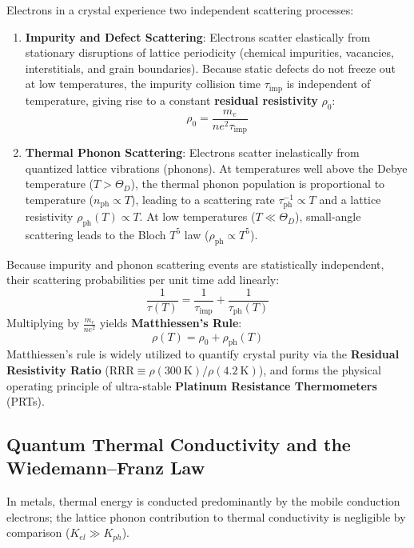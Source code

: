 \documentclass[11pt,a4paper]{article}
\begin{document}
Electrons in a crystal experience two independent scattering processes:
\begin{enumerate}[leftmargin=*]
    \item \textbf{Impurity and Defect Scattering}: Electrons scatter elastically from stationary disruptions of lattice periodicity (chemical impurities, vacancies, interstitials, and grain boundaries). Because static defects do not freeze out at low temperatures, the impurity collision time $\tau_{\mathrm{imp}}$ is independent of temperature, giving rise to a constant \textbf{residual resistivity} $\rho_0$:
    \begin{equation}
    \rho_0 = \frac{m_e}{n e^2 \tau_{\mathrm{imp}}}
    \end{equation}
    \item \textbf{Thermal Phonon Scattering}: Electrons scatter inelastically from quantized lattice vibrations (phonons). At temperatures well above the Debye temperature ($T > \Theta_D$), the thermal phonon population is proportional to temperature ($n_{\mathrm{ph}} \propto T$), leading to a scattering rate $\tau_{\mathrm{ph}}^{-1} \propto T$ and a lattice resistivity $\rho_{\mathrm{ph}}(T) \propto T$. At low temperatures ($T \ll \Theta_D$), small-angle scattering leads to the Bloch $T^5$ law ($\rho_{\mathrm{ph}} \propto T^5$).
\end{enumerate}
Because impurity and phonon scattering events are statistically independent, their scattering probabilities per unit time add linearly:
\begin{equation}
\boxed{\frac{1}{\tau(T)} = \frac{1}{\tau_{\mathrm{imp}}} + \frac{1}{\tau_{\mathrm{ph}}(T)}}
\label{eq:scattering_rates_sum}
\end{equation}
Multiplying by $\frac{m_e}{ne^2}$ yields \textbf{Matthiessen's Rule}:
\begin{equation}
\boxed{\rho(T) = \rho_0 + \rho_{\mathrm{ph}}(T)}
\label{eq:matthiessens_rule}
\end{equation}
Matthiessen's rule is widely utilized to quantify crystal purity via the \textbf{Residual Resistivity Ratio} ($\mathrm{RRR} \equiv \rho(300\ \mathrm{K})/\rho(4.2\ \mathrm{K})$), and forms the physical operating principle of ultra-stable \textbf{Platinum Resistance Thermometers} (PRTs).

\subsection{Quantum Thermal Conductivity and the Wiedemann--Franz Law}
In metals, thermal energy is conducted predominantly by the mobile conduction electrons; the lattice phonon contribution to thermal conductivity is negligible by comparison ($K_{el} \gg K_{ph}$).
\end{document}
